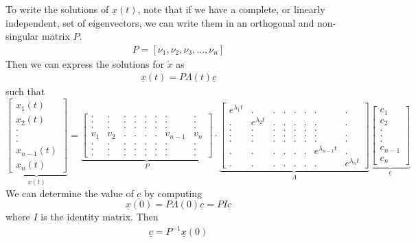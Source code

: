 To write the solutions of $\underline{x}(t)$, note that if we have a complete, or linearly independent, set of eigenvectors, we can write them in an orthogonal and non-singular matrix $P$. 
\begin{align}
    P = [\nu_1,\nu_2,\nu_3,...,\nu_n]
\end{align}
Then we can express the solutions for $\dot x$ as  
\begin{align}
     \underline{x}(t) = P \Lambda(t) \underline{c} 
\end{align}
 such that
\[
\underbrace{
\begin{bmatrix}
  x_1(t) \\  x_2(t)  \\ . \\ .  \\ .  \\ x_{n-1}(t) \\ x_{n}(t)
\end{bmatrix}}_{\underline{x}(t)} =
\underbrace{
\begin{bmatrix}
  . &. &. &. & .&. &. &.  \\. &. &. &. & .&. &. &.  \\  . &. &. &. & .&. &. &. \\ v_{1} &v_{2} &. &. & .&. &v_{n-1} &v_{n} \\ . &. &. &. & .&. &. &. \\ . &. &. &. & .&. &. &. \\ . &. &. &. & .&. &. &.
\end{bmatrix}
}_{P}\cdot 
\underbrace{
\begin{bmatrix}
  e^{\lambda_{1}t} &. &. &. & .&. &. &.  \\  . & e^{\lambda_{2}t} &. &. & .&. &. &. \\  . &. &. & .&. &.&. \\ . &. &. &. & .&. &. &.  \\ . &. &. &. & .&. &. &. \\ . &. &. &. & .&. &e^{\lambda_{n-1}t} &. \\ . &. &. &. & .&. &. &e^{\lambda_{n}t} 
\end{bmatrix}}_{\Lambda} \underbrace{
\begin{bmatrix}
  c_1 \\  c_2  \\ . \\ .  \\ .  \\ c_{n-1}  \\c_{n} 
\end{bmatrix}}_{\underline{c}}
\] We can determine the value of $\underline{c}$ by computing $$ \underline{x}(0) = P \Lambda(0) \underline{c} = PI \underline{c}$$ where $I$ is the identity matrix. Then  \begin{align}
    \underline{c} = P^{-1}\underline{x}(0)
\end{align} 

